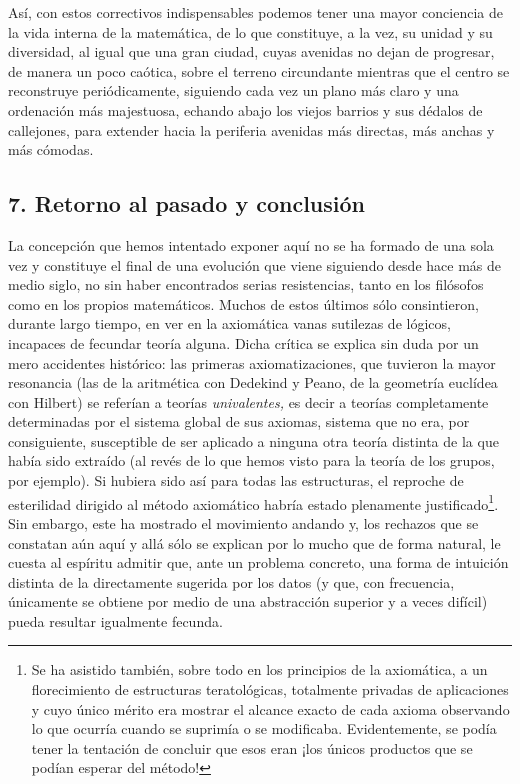 \documentclass[a4paper, 12pt, draft]{article}
\begin{document}
Así, con estos correctivos indispensables podemos tener una mayor conciencia de la vida interna de la matemática, de lo que constituye, a la vez, su unidad y su diversidad, al igual que una gran ciudad, cuyas avenidas no dejan de progresar, de manera un poco caótica, sobre el terreno circundante mientras que el centro se reconstruye periódicamente, siguiendo cada vez un plano más claro y una ordenación más majestuosa, echando abajo los viejos barrios y sus dédalos de callejones, para extender hacia la periferia avenidas más directas, más anchas y más cómodas.

\subsection*{7. Retorno al pasado y conclusión}

La concepción que hemos intentado exponer aquí no se ha formado de una sola vez y constituye el final de una evolución que viene siguiendo desde hace más de medio siglo, no sin haber encontrados serias resistencias, tanto en los filósofos como en los propios matemáticos. Muchos de estos últimos sólo consintieron, durante largo tiempo, en ver en la axiomática vanas sutilezas de lógicos, incapaces de fecundar teoría alguna. Dicha crítica se explica sin duda por un mero accidentes histórico: las primeras axiomatizaciones, que tuvieron la mayor resonancia (las de la aritmética con Dedekind y Peano, de la geometría euclídea con Hilbert) se referían a teorías \textit{univalentes,} es decir a teorías completamente determinadas por el sistema global de sus axiomas, sistema que no era, por consiguiente, susceptible de ser aplicado a ninguna otra teoría distinta de la que había sido extraído (al revés de lo que hemos visto para la teoría de los grupos, por ejemplo). Si hubiera sido así para todas las estructuras, el reproche de esterilidad dirigido al método axiomático habría estado plenamente justificado\footnote{Se ha asistido también, sobre todo en los principios de la axiomática, a un florecimiento de estructuras teratológicas, totalmente privadas de aplicaciones y cuyo único mérito era mostrar el alcance exacto de cada axioma observando lo que ocurría cuando se suprimía o se modificaba. Evidentemente, se podía tener la tentación de concluir que esos eran ¡los únicos productos que se podían esperar del método!}. Sin embargo, este ha mostrado el movimiento andando y, los rechazos que se constatan aún aquí y allá sólo se explican por lo mucho que de forma natural, le cuesta al espíritu admitir que, ante un problema concreto, una forma de intuición distinta de la directamente sugerida por los datos (y que, con frecuencia, únicamente se obtiene por medio de una abstracción superior y a veces difícil) pueda resultar igualmente fecunda.
\end{document}

